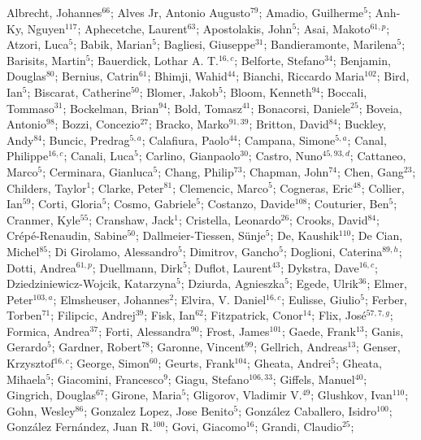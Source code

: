 Albrecht, Johannes$^{66}$;
Alves Jr, Antonio Augusto$^{79}$;
Amadio, Guilherme$^{5}$;
Anh-Ky, Nguyen$^{117}$;
Aphecetche, Laurent$^{63}$;
Apostolakis, John$^{5}$;
Asai, Makoto$^{61,p}$;
Atzori, Luca$^{5}$;
Babik, Marian$^{5}$;
Bagliesi, Giuseppe$^{31}$;
Bandieramonte, Marilena$^{5}$;
Barisits, Martin$^{5}$;
Bauerdick, Lothar A. T.$^{16,c}$;
Belforte, Stefano$^{34}$;
Benjamin, Douglas$^{80}$;
Bernius, Catrin$^{61}$;
Bhimji, Wahid$^{44}$;
Bianchi, Riccardo Maria$^{102}$;
Bird, Ian$^{5}$;
Biscarat, Catherine$^{50}$;
Blomer, Jakob$^{5}$;
Bloom, Kenneth$^{94}$;
Boccali, Tommaso$^{31}$;
Bockelman, Brian$^{94}$;
Bold, Tomasz$^{41}$;
Bonacorsi, Daniele$^{25}$;
Boveia, Antonio$^{98}$;
Bozzi, Concezio$^{27}$;
Bracko, Marko$^{91,39}$;
Britton, David$^{84}$;
Buckley, Andy$^{84}$;
Buncic, Predrag$^{5,a}$;
Calafiura, Paolo$^{44}$;
Campana, Simone$^{5,a}$;
Canal, Philippe$^{16,c}$;
Canali, Luca$^{5}$;
Carlino, Gianpaolo$^{30}$;
Castro, Nuno$^{45,93,d}$;
Cattaneo, Marco$^{5}$;
Cerminara, Gianluca$^{5}$;
Chang, Philip$^{73}$;
Chapman, John$^{74}$;
Chen, Gang$^{23}$;
Childers, Taylor$^{1}$;
Clarke, Peter$^{81}$;
Clemencic, Marco$^{5}$;
Cogneras, Eric$^{48}$;
Collier, Ian$^{59}$;
Corti, Gloria$^{5}$;
Cosmo, Gabriele$^{5}$;
Costanzo, Davide$^{108}$;
Couturier, Ben$^{5}$;
Cranmer, Kyle$^{55}$;
Cranshaw, Jack$^{1}$;
Cristella, Leonardo$^{26}$;
Crooks, David$^{84}$;
Crépé-Renaudin, Sabine$^{50}$;
Dallmeier-Tiessen, Sünje$^{5}$;
De, Kaushik$^{110}$;
De Cian, Michel$^{85}$;
Di Girolamo, Alessandro$^{5}$;
Dimitrov, Gancho$^{5}$;
Doglioni, Caterina$^{89,h}$;
Dotti, Andrea$^{61,p}$;
Duellmann, Dirk$^{5}$;
Duflot, Laurent$^{43}$;
Dykstra, Dave$^{16,c}$;
Dziedziniewicz-Wojcik, Katarzyna$^{5}$;
Dziurda, Agnieszka$^{5}$;
Egede, Ulrik$^{36}$;
Elmer, Peter$^{103,a}$;
Elmsheuser, Johannes$^{2}$;
Elvira, V. Daniel$^{16,c}$;
Eulisse, Giulio$^{5}$;
Ferber, Torben$^{71}$;
Filipcic, Andrej$^{39}$;
Fisk, Ian$^{62}$;
Fitzpatrick, Conor$^{14}$;
Flix, José$^{57,7,g}$;
Formica, Andrea$^{37}$;
Forti, Alessandra$^{90}$;
Frost, James$^{101}$;
Gaede, Frank$^{13}$;
Ganis, Gerardo$^{5}$;
Gardner, Robert$^{78}$;
Garonne, Vincent$^{99}$;
Gellrich, Andreas$^{13}$;
Genser, Krzysztof$^{16,c}$;
George, Simon$^{60}$;
Geurts, Frank$^{104}$;
Gheata, Andrei$^{5}$;
Gheata, Mihaela$^{5}$;
Giacomini, Francesco$^{9}$;
Giagu, Stefano$^{106,33}$;
Giffels, Manuel$^{40}$;
Gingrich, Douglas$^{67}$;
Girone, Maria$^{5}$;
Gligorov, Vladimir V.$^{49}$;
Glushkov, Ivan$^{110}$;
Gohn, Wesley$^{86}$;
Gonzalez Lopez, Jose Benito$^{5}$;
González Caballero, Isidro$^{100}$;
González Fernández, Juan R.$^{100}$;
Govi, Giacomo$^{16}$;
Grandi, Claudio$^{25}$;
